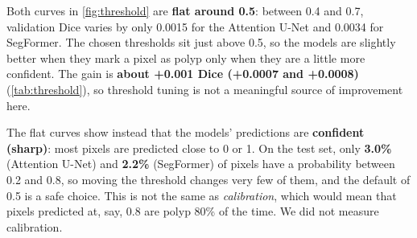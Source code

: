 Both curves in \cref{fig:threshold} are \textbf{flat around 0.5}: between 0.4 and 0.7, validation Dice
varies by only 0.0015 for the Attention U-Net and 0.0034 for SegFormer. The chosen thresholds sit just above
0.5, so the models are slightly better when they mark a pixel as polyp only when they are a little more
confident. The gain is \textbf{about +0.001 Dice (+0.0007 and +0.0008)} (\cref{tab:threshold}), so threshold tuning is not a meaningful
source of improvement here.

The flat curves show instead that the models' predictions are \textbf{confident (sharp)}: most pixels are
predicted close to 0 or 1. On the test set, only \textbf{3.0\%} (Attention U-Net) and \textbf{2.2\%} (SegFormer) of
pixels have a probability between 0.2 and 0.8, so moving the threshold changes very few of them, and the
default of 0.5 is a safe choice. This is not the same as \emph{calibration}, which would mean that pixels
predicted at, say, 0.8 are polyp 80\% of the time. We did not measure calibration.
